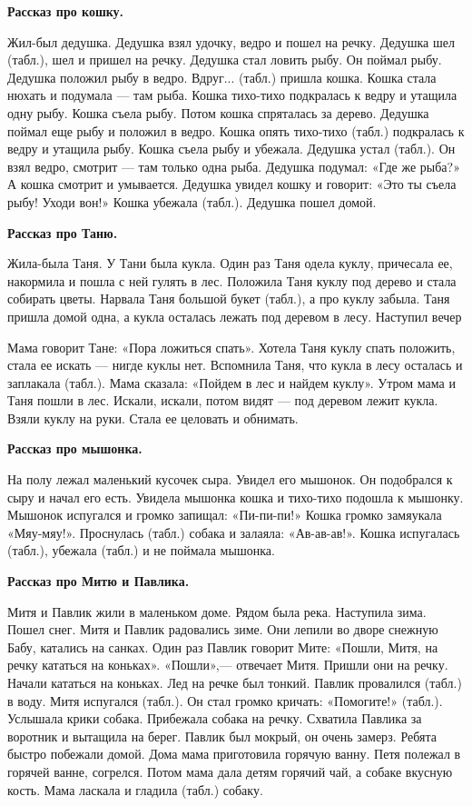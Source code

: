 \documentclass[a5paper]{book}
\begin{document}
\textbf{Рассказ про кошку.}

Жил-был дедушка. Дедушка взял удочку, ведро и пошел на речку. Дедушка
шел (табл.), шел и пришел на речку. Дедушка стал ловить рыбу. Он поймал
рыбу. Дедушка положил рыбу в ведро. Вдруг... (табл.) пришла кошка. Кошка
стала нюхать и подумала --- там рыба. Кошка тихо-тихо подкралась к ведру
и утащила одну рыбу. Кошка съела рыбу. Потом кошка спряталась за дерево.
Дедушка поймал еще рыбу и положил в ведро. Кошка опять тихо-тихо (табл.)
подкралась к ведру и утащила рыбу. Кошка съела рыбу и убежала. Дедушка
устал (табл.). Он взял ведро, смотрит --- там только одна рыба. Дедушка
подумал: «Где же рыба?» А кошка смотрит и умывается. Дедушка увидел
кошку и говорит: «Это ты съела рыбу! Уходи вон!» Кошка убежала (табл.).
Дедушка пошел домой.

\textbf{Рассказ про Таню.}

Жила-была Таня. У Тани была кукла. Один раз Таня одела куклу, причесала
ее, накормила и пошла с ней гулять в лес. Положила Таня куклу под дерево
и стала собирать цветы. Нарвала Таня большой букет (табл.), а про куклу
забыла. Таня пришла домой одна, а кукла осталась лежать под деревом в
лесу. Наступил вечер

Мама говорит Тане: «Пора ложиться спать». Хотела Таня куклу спать
положить, стала ее искать --- нигде куклы нет. Вспомнила Таня, что кукла
в лесу осталась и заплакала (табл.). Мама сказала: «Пойдем в лес и
найдем куклу». Утром мама и Таня пошли в лес. Искали, искали, потом
видят --- под деревом лежит кукла. Взяли куклу на руки. Стала ее
целовать и обнимать.

\textbf{Рассказ про мышонка.}

На полу лежал маленький кусочек сыра. Увидел его мышонок. Он подобрался
к сыру и начал его есть. Увидела мышонка кошка и тихо-тихо подошла к
мышонку. Мышонок испугался и громко запищал: «Пи-пи-пи!» Кошка громко
замяукала «Мяу-мяу!». Проснулась (табл.) собака и залаяла: «Ав-ав-ав!».
Кошка испугалась (табл.), убежала (табл.) и не поймала мышонка.

\textbf{Рассказ про Митю и Павлика.}

Митя и Павлик жили в маленьком доме. Рядом была река. Наступила зима.
Пошел снег. Митя и Павлик радовались зиме. Они лепили во дворе снежную
Бабу, катались на санках. Один раз Павлик говорит Мите: «Пошли, Митя, на
речку кататься на коньках». «Пошли»,--- отвечает Митя. Пришли они на
речку. Начали кататься на коньках. Лед на речке был тонкий. Павлик
провалился (табл.) в воду. Митя испугался (табл.). Он стал громко
кричать: «Помогите!» (табл.). Услышала крики собака. Прибежала собака на
речку. Схватила Павлика за воротник и вытащила на берег. Павлик был
мокрый, он очень замерз. Ребята быстро побежали домой. Дома мама
приготовила горячую ванну. Петя полежал в горячей ванне, согрелся. Потом
мама дала детям горячий чай, а собаке вкусную кость. Мама ласкала и
гладила (табл.) собаку.
\end{document}
